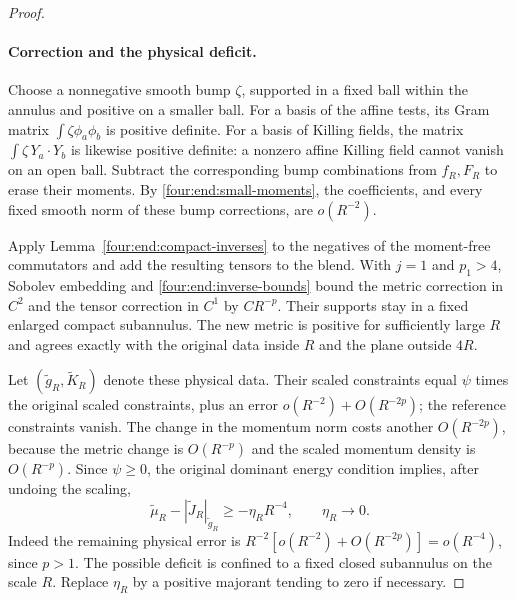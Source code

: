 \begin{proof}
\paragraph{Correction and the physical deficit.}
Choose a nonnegative smooth bump \(\zeta\), supported in a fixed ball
within the annulus and positive on a smaller ball. For a basis of the
affine tests, its Gram matrix
\(\int\zeta\phi_a\phi_b\) is positive definite. For a basis of
Killing fields, the matrix \(\int\zeta\,Y_a\cdot Y_b\) is likewise
positive definite: a nonzero affine Killing field cannot vanish on an
open ball. Subtract the corresponding bump combinations from
\(f_R,F_R\) to erase their moments. By \eqref{four:end:small-moments},
the coefficients, and every fixed smooth norm of these bump corrections,
are \(o(R^{-2})\).

Apply Lemma~\ref{four:end:compact-inverses} to the negatives of the
moment-free commutators and add the resulting tensors to the blend.
With \(j=1\) and \(p_1>4\), Sobolev embedding and
\eqref{four:end:inverse-bounds} bound the metric correction in \(C^2\)
and the tensor correction in \(C^1\) by \(CR^{-p}\).
Their supports stay in a fixed enlarged compact subannulus.
The new metric is positive for sufficiently large \(R\) and agrees
exactly with the original data inside \(R\) and the plane outside
\(4R\).

Let \((\widetilde g_R,\widetilde K_R)\) denote these physical data.
Their scaled constraints equal \(\psi\) times the original scaled
constraints, plus an error
\(o(R^{-2})+O(R^{-2p})\); the reference constraints vanish.
The change in the momentum norm costs another \(O(R^{-2p})\), because
the metric change is \(O(R^{-p})\) and the scaled momentum density is
\(O(R^{-p})\). Since \(\psi\ge0\), the original dominant energy
condition implies, after undoing the scaling,
\begin{equation}\label{four:end:physical-deficit}
 \widetilde\mu_R-|\widetilde J_R|_{\widetilde g_R}
       \ge-\eta_RR^{-4},\qquad \eta_R\longrightarrow0.
\end{equation}
Indeed the remaining physical error is
\(R^{-2}[o(R^{-2})+O(R^{-2p})]=o(R^{-4})\), since \(p>1\).
The possible deficit is confined to a fixed closed subannulus on the
scale \(R\). Replace \(\eta_R\) by a positive majorant tending to zero
if necessary.


\end{proof}
